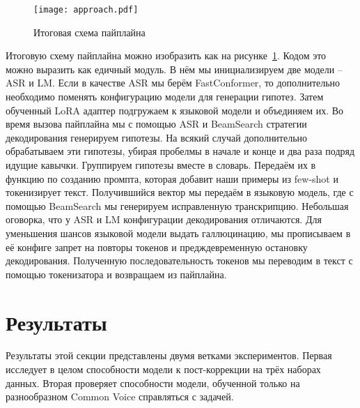 \begin{figure}[!t]
  \centering
  \texttt{[image: approach.pdf]}
  \caption{Итоговая схема пайплайна}
  \label{fig:approach}
\end{figure}

Итоговую схему пайплайна можно изобразить как на рисунке~\ref{fig:approach}.
Кодом это можно выразить как едичный модуль.
В нём мы инициализируем две модели -- ASR и LM.
Если в качестве ASR мы берём FastConformer, то дополнительно необходимо поменять конфигурацию модели для генерации гипотез.
Затем обученный LoRA адаптер подгружаем к языковой модели и объединяем их.
Во время вызова пайплайна мы с помощью ASR и BeamSearch стратегии декодирования генерируем гипотезы.
На всякий случай дополнительно обрабатываем эти гипотезы, убирая пробелмы в начале и конце и два раза подряд идущие кавычки.
Группируем гипотезы вместе в словарь.
Передаём их в функцию по созданию промпта, которая добавит наши примеры из few-shot и токенизирует текст.
Получившийся вектор мы передаём в языковую модель, где с помощью BeamSearch мы генерируем исправленную транскрипцию.
Небольшая оговорка, что у ASR и LM конфигурации декодирования отличаются.
Для уменьшения шансов языковой модели выдать галлюцинацию, мы прописываем в её конфиге запрет на повторы токенов и предждевременную остановку декодирования.
Полученную последовательность токенов мы переводим в текст с помощью токенизатора и возвращаем из пайплайна.

\section{Результаты}

Результаты этой секции представлены двумя ветками экспериментов.
Первая исследует в целом способности модели к пост-коррекции на трёх наборах данных.
Вторая проверяет способности модели, обученной только на разнообразном Common Voice справляться с задачей.

